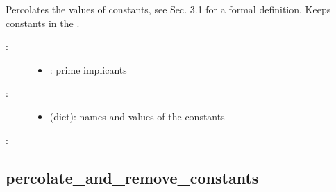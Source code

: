 \documentclass[letterpaper,10pt,english]{sphinxmanual}
\begin{document}
\begin{fulllineitems}
\label{\detokenize{PrimeImplicants:PyBoolNet.PrimeImplicants.percolate_and_keep_constants}}
Percolates the values of constants, see {\hyperref[\detokenize{Bibliography:klarner2015approx}]{}} Sec. 3.1 for a formal definition.
Keeps constants in the .
\begin{description}
\item[{:}] \leavevmode\begin{itemize}
\item {} 
: prime implicants

\end{itemize}

\item[{:}] \leavevmode\begin{itemize}
\item {} 
 (dict): names and values of the constants

\end{itemize}

\end{description}

:

\begin{sphinxVerbatim}[commandchars=\\\{\}]
  
\end{sphinxVerbatim}

\end{fulllineitems}



\subsection{percolate\_and\_remove\_constants}
\label{\detokenize{PrimeImplicants:percolate-and-remove-constants}}\label{\detokenize{PrimeImplicants:id15}}
\end{document}
